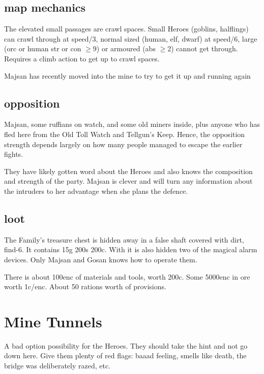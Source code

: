 \subsection*{map mechanics}
The elevated small passages are crawl spaces. Small Heroes (goblins, halflings) can crawl through at speed/3, normal sized (human, elf, dwarf) at speed/6, large (orc or human str or con $\geq9$) or armoured (abs $\geq$2) cannot get through. Requires a climb action to get up to crawl spaces.

Majsan has recently moved into the mine to try to get it up and running again


\subsection*{opposition}
Majsan, some ruffians on watch, and some old miners inside, plus anyone who has fled here from the Old Toll Watch and Tellgun's Keep. Hence, the opposition strength depends largely on how many people managed to escape the earlier fights.

They have likely gotten word about the Heroes and also knows the composition and strength of the party. Majsan is clever and will turn any information about the intruders to her advantage when she plans the defence.


\subsection*{loot}
The Family's treasure chest is hidden away in a false shaft covered with dirt, find-6. It contains 15g 200s 200c. With it is also hidden two of the magical alarm devices. Only Majsan and Gosan knows how to operate them.

There is about 100enc of materials and tools, worth 200c. Some 5000enc in ore worth 1c/enc. About 50 rations worth of provisions.









\section*{Mine Tunnels}
A bad option possibility for the Heroes. They should take the hint and not go down here. Give them plenty of red flags: baaad feeling, smells like death, the bridge was deliberately razed, etc.

